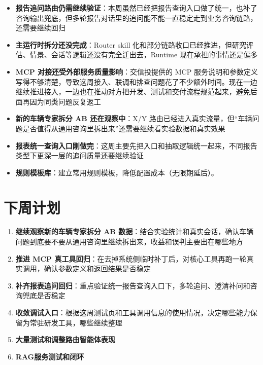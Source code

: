 \documentclass[UTF8]{ctexart}
\begin{document}
\begin{itemize}
\item \textbf{报告追问路由仍需继续验证}：本周虽然已经把报告查询入口做了统一，也补了咨询输出兜底，但多轮报告对话里的追问能不能一直稳定走到业务咨询链路，还需要继续回归
\item \textbf{主运行时拆分还没完成}：Router skill 化和部分链路收口已经推进，但研究评估、情景、会话等逻辑还没有完全迁出去，Runtime 现在承担的事情还是偏多
\item \textbf{MCP 对接还受外部服务质量影响}：交信投提供的 MCP 服务说明和参数定义写得不够清楚，导致这周接入、联调和排查问题花了不少额外时间。现在一边继续推进接入，一边也在推动对方把开发、测试和交付流程规范起来，避免后面再因为同类问题反复返工
\item \textbf{新的车辆专家拆分 AB 还在观察中}：X/Y 路由已经进入真实流量，但“车辆问题是否值得从通用咨询里拆出来”还需要继续看实验数据和真实效果
\item \textbf{报表统一查询入口刚做完}：这周主要先把入口和抽取逻辑统一起来，不同报告类型下更深一层的追问质量还要继续验证
\item \textbf{规则模板库}：建立常用规则模板，降低配置成本（无限期延后）。
\end{itemize}

\section{下周计划}

\begin{enumerate}
\item \textbf{继续观察新的车辆专家拆分 AB 数据}：结合实验统计和真实会话，确认车辆问题到底要不要从通用咨询里继续拆出来，收益和误判主要出在哪些地方
\item \textbf{推进 MCP 真工具回归}：在去掉系统侧临时补丁后，对核心工具再跑一轮真实调用，确认参数定义和返回结果是否稳定
\item \textbf{补齐报表追问回归}：重点验证统一报告查询入口下，多轮追问、澄清补问和咨询兜底是否稳定
\item \textbf{收敛调试入口}：根据这周测试页和工具调用信息的使用情况，决定哪些能力保留为常驻研发工具，哪些继续整理
\item \textbf{大量测试和调整路由智能体表现}
\item \textbf{RAG服务测试和闭环}
\end{enumerate}
\end{document}
